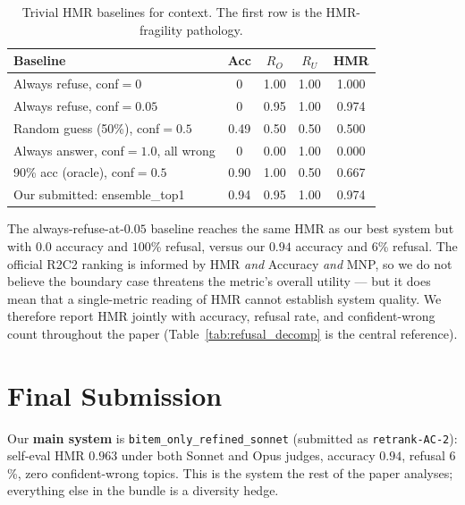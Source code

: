 \documentclass[11pt,a4paper]{article}
\newcommand{\HMR}{\textsc{HMR}}
\begin{document}
\begin{table}[h]
\centering
\caption{Trivial \HMR{} baselines for context. The first row is the
HMR-fragility pathology.}
\label{tab:trivial}
\begin{tabular}{lcccc}
\toprule
Baseline & Acc & $R_O$ & $R_U$ & \HMR \\
\midrule
Always refuse, conf$=0$         & 0    & 1.00 & 1.00 & 1.000 \\
Always refuse, conf$=0.05$      & 0    & 0.95 & 1.00 & 0.974 \\
Random guess (50\%), conf$=0.5$ & 0.49 & 0.50 & 0.50 & 0.500 \\
Always answer, conf$=1.0$, all wrong & 0  & 0.00 & 1.00 & 0.000 \\
90\% acc (oracle), conf$=0.5$   & 0.90 & 1.00 & 0.50 & 0.667 \\
\midrule
Our submitted: ensemble\_top1   & 0.94 & 0.95 & 1.00 & 0.974 \\
\bottomrule
\end{tabular}
\end{table}

\noindent The always-refuse-at-$0.05$ baseline reaches the same HMR
as our best system but with $0.0$ accuracy and $100$\% refusal,
versus our $0.94$ accuracy and $6$\% refusal. The official R2C2
ranking is informed by HMR \emph{and} Accuracy \emph{and} MNP, so
we do not believe the boundary case threatens the metric's overall
utility — but it does mean that a single-metric reading of HMR
cannot establish system quality. We therefore report HMR jointly
with accuracy, refusal rate, and confident-wrong count throughout
the paper (Table~\ref{tab:refusal_decomp} is the central reference).

\section{Final Submission}

Our \textbf{main system} is \texttt{bitem\_only\_refined\_sonnet}
(submitted as \texttt{retrank-AC-2}): self-eval HMR $0.963$ under
both Sonnet and Opus judges, accuracy $0.94$, refusal $6$\%, zero
confident-wrong topics. This is the system the rest of the paper
analyses; everything else in the bundle is a diversity hedge.
\end{document}
